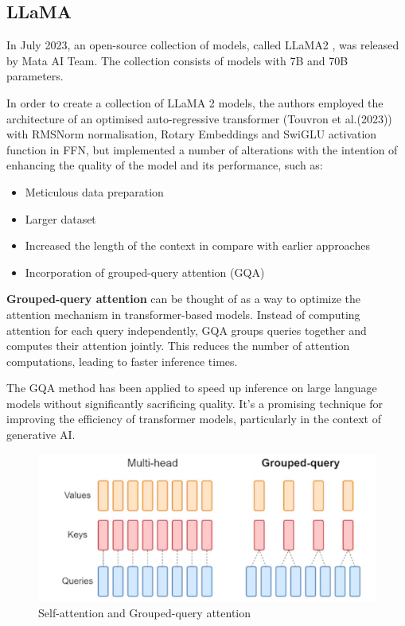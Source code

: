 \documentclass[PMI,VKR]{HSEUniversity}
\begin{document}
\subsection{LLaMA}

In July 2023, an open-source collection of models, called LLaMA2 \cite{llama:2023}, was released by Mata AI Team. The collection consists of models with 7B and 70B parameters.

In order to create a collection of LLaMA 2 models, the authors employed the architecture of an optimised auto-regressive transformer (Touvron et al.(2023)) with RMSNorm normalisation, Rotary Embeddings and SwiGLU activation function in FFN, but implemented a number of alterations with the intention of enhancing the quality of the model and its performance, such as:
\begin{itemize}
    \item Meticulous data preparation
    \item Larger dataset
    \item Increased the length of the context in compare with earlier approaches
    \item Incorporation of grouped-query attention (GQA)
\end{itemize}   

\textbf{Grouped-query attention} can be thought of as a way to optimize the attention mechanism in transformer-based models. 
Instead of computing attention for each query independently, GQA groups queries together and computes their attention jointly. This reduces the number of attention computations, leading to faster inference times.

The GQA method has been applied to speed up inference on large language models without significantly sacrificing quality. 
It's a promising technique for improving the efficiency of transformer models, particularly in the context of generative AI.

\begin{figure}[h]
    \centering
    \includegraphics[scale=1]{img/gqa.png}
    \caption{Self-attention and Grouped-query attention}
\end{figure} 
\end{document}
